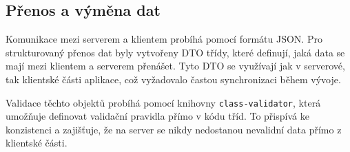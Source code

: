 \subsection{Přenos a výměna dat}

Komunikace mezi serverem a klientem probíhá pomocí formátu JSON.
Pro strukturovaný přenos dat byly vytvořeny DTO třídy, které definují, jaká data se mají mezi klientem a serverem přenášet. 
Tyto DTO se využívají jak v serverové, tak klientské části aplikace, což vyžadovalo častou synchronizaci během vývoje.

Validace těchto objektů probíhá pomocí knihovny \texttt{class-validator}, která umožňuje definovat validační pravidla přímo v kódu tříd. 
To přispívá ke konzistenci a zajišťuje, že na server se nikdy nedostanou nevalidní data přímo z klientské části.







